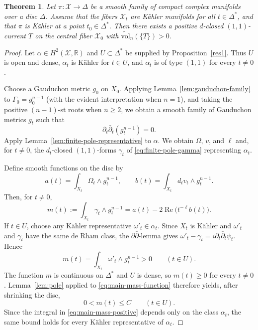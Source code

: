 \documentclass[11pt,letterpaper]{amsart}
\numberwithin{equation}{section}
\newcommand{\RR}{\mathbb{R}}
\newcommand{\cal}{\mathcal}
\def\cX{{\cal X}}
\newtheorem{theo}[prop]{Theorem}
\begin{document}
\begin{theo}\label{limit}
Let $\pi:\cX\to\Delta$ be a smooth family of compact complex manifolds over a
disc $\Delta$. Assume that the fibers $\cX_t$ are K\"ahler manifolds for all
$t\in\Delta^*$, and that $\pi$ is K\"ahler at a point $t_0\in\Delta^*$. Then
there exists a positive $d$-closed $(1,1)$-current $T$ on the central fiber
$\cX_0$ with
$\widetilde{\mathrm{vol}}_n(\{T\})>0$.
\end{theo}
\begin{proof}
Let $\alpha\in H^2(\cX,\RR)$ and $U\subset\Delta^*$ be supplied by
Proposition~\ref{res1}. Thus $U$ is open and dense,
$\alpha_t$ is K\"ahler for $t\in U$, and $\alpha_t$ is of type $(1,1)$ for
every $t\ne0$.

Choose a Gauduchon metric $g_0$ on $X_0$. Applying
Lemma~\ref{lem:gauduchon-family} to $\Gamma_0=g_0^{n-1}$ (with the evident
interpretation when $n=1$), and taking the positive $(n-1)$-st roots when
$n\ge2$, we obtain a smooth family of Gauduchon metrics $g_t$ such that
\begin{equation}\label{eq:family-gauduchon}
 \partial_t\bar\partial_t(g_t^{n-1})=0.
\end{equation}
Apply Lemma~\ref{lem:finite-pole-representative} to $\alpha$. We obtain
$\Omega$, $v$, and $\ell$ and, for $t\ne0$, the $d_t$-closed $(1,1)$-forms
$\gamma_t$ of \eqref{eq:finite-pole-gamma} representing $\alpha_t$.

Define smooth functions on the disc by
\begin{equation}\label{eq:main-a-b}
 a(t)=\int_{X_t}\Omega_t\wedge g_t^{n-1},\qquad
 b(t)=\int_{X_t}d_tv_t\wedge g_t^{n-1}.
\end{equation}
Then, for $t\ne0$,
\begin{equation}\label{eq:main-mass-function}
 m(t):=\int_{X_t}\gamma_t\wedge g_t^{n-1}
 =a(t)-2\operatorname{Re}\bigl(t^{-\ell}b(t)\bigr).
\end{equation}
If $t\in U$, choose any K\"ahler representative $\omega'_t\in\alpha_t$.
Since $X_t$ is K\"ahler and $\omega'_t$ and $\gamma_t$ have the same de Rham
class, the $\partial\bar\partial$-lemma gives
$\omega'_t-\gamma_t=i\partial_t\bar\partial_t\psi_t$. Hence
\begin{equation}\label{eq:main-mass-positive}
 m(t)=\int_{X_t}\omega'_t\wedge g_t^{n-1}>0
 \qquad(t\in U).
\end{equation}
The function $m$ is continuous on $\Delta^*$ and $U$ is dense, so
$m(t)\ge0$ for every $t\ne0$. Lemma~\ref{lem:pole} applied to
\eqref{eq:main-mass-function} therefore yields, after shrinking the disc,
\begin{equation}\label{eq:main-mass-bound}
 0<m(t)\le C\qquad(t\in U).
\end{equation}
Since the integral in \eqref{eq:main-mass-positive} depends only on the class $\alpha_t$, the same bound holds for every K\"ahler representative of $\alpha_t$.


\end{proof}
\end{document}
